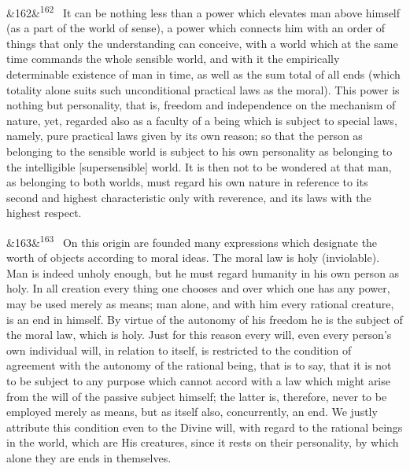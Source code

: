 \documentclass[12pt]{article}
\newcommand{\para}[1][]{\par\noindent\ifx&#1&\else\textsuperscript{\footnotesize #1}~\fi}
\begin{document}
\para[162] It can be nothing less than a power which elevates man above himself (as a part of the world of sense), a power which connects him with an order of things that only the understanding can conceive, with a world which at the same time commands the whole sensible world, and with it the empirically determinable existence of man in time, as well as the sum total of all ends (which totality alone suits such unconditional practical laws as the moral). This power is nothing but personality, that is, freedom and independence on the mechanism of nature, yet, regarded also as a faculty of a being which is subject to special laws, namely, pure practical laws given by its own reason; so that the person as belonging to the sensible world is subject to his own personality as belonging to the intelligible [supersensible] world. It is then not to be wondered at that man, as belonging to both worlds, must regard his own nature in reference to its second and highest characteristic only with reverence, and its laws with the highest respect.

\para[163] On this origin are founded many expressions which designate the worth of objects according to moral ideas. The moral law is holy (inviolable). Man is indeed unholy enough, but he must regard humanity in his own person as holy. In all creation every thing one chooses and over which one has any power, may be used merely as means; man alone, and with him every rational creature, is an end in himself. By virtue of the autonomy of his freedom he is the subject of the moral law, which is holy. Just for this reason every will, even every person's own individual will, in relation to itself, is restricted to the condition of agreement with the autonomy of the rational being, that is to say, that it is not to be subject to any purpose which cannot accord with a law which might arise from the will of the passive subject himself; the latter is, therefore, never to be employed merely as means, but as itself also, concurrently, an end. We justly attribute this condition even to the Divine will, with regard to the rational beings in the world, which are His creatures, since it rests on their personality, by which alone they are ends in themselves.
\end{document}
